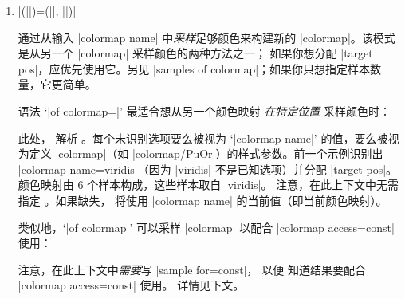 {\begin{enumerate}
\begin{codeexample}[]
\pgfplotscolorbardrawstandalone[
    colormap={example}{
      colors of colormap=(0,400,800,900,
          1000 of viridis)
    },
    colorbar horizontal,
    colormap access=const,
]
\end{codeexample}

        注意，|colors of colormap| 在 |cycle list| 定义期间也可用。

        |samples of colormap| 的所有特殊说明（如花括号、选项列表支持、
        位置）在此同样适用。
    \item {}|(||)=(||, ||)|

        通过从输入 |colormap name| 中\emph{采样}足够颜色来构建新的
        |colormap|。该模式是从另一个 |colormap| 采样颜色的两种方法之一；
        如果你想分配 |target pos|，应优先使用它。另见
        |samples of colormap|；如果你只想指定样本数量，它更简单。

        语法 `|of colormap=|' 最适合想从另一个颜色映射
        \emph{在特定位置} 采样颜色时：
\begin{codeexample}[]
\pgfplotscolorbardrawstandalone[
    colormap={example}{
        of colormap={
            viridis,
            target pos={0,400,500,700,800,1000},
        },
    },
    colorbar horizontal,
    colormap access=map,
]
\end{codeexample}
        此处，\PGFPlots{} 解析 。每个未识别选项要么被视为
        `|colormap name|' 的值，要么被视为定义 |colormap|（如
        |colormap/PuOr|）的样式参数。前一个示例识别出
        |colormap name=viridis|（因为 |viridis| 不是已知选项）并分配
        |target pos|。颜色映射由 $6$ 个样本构成，这些样本取自 |viridis|。
        注意，在此上下文中无需指定 。如果缺失，
        将使用 |colormap name| 的当前值（即当前颜色映射）。

        类似地，`|of colormap|' 可以采样 |colormap| 以配合
        |colormap access=const| 使用：
\begin{codeexample}[]
\pgfplotscolorbardrawstandalone[
    colormap={example}{
        of colormap={
            viridis,
            target pos={0,400,500,700,800,1000},
            sample for=const,
        },
    },
    colorbar horizontal,
    colormap access=const]
\end{codeexample}
        注意，在此上下文中\emph{需要}写 |sample for=const|，
        以便 \PGFPlots{} 知道结果要配合 |colormap access=const| 使用。
        详情见下文。


\end{enumerate}}
